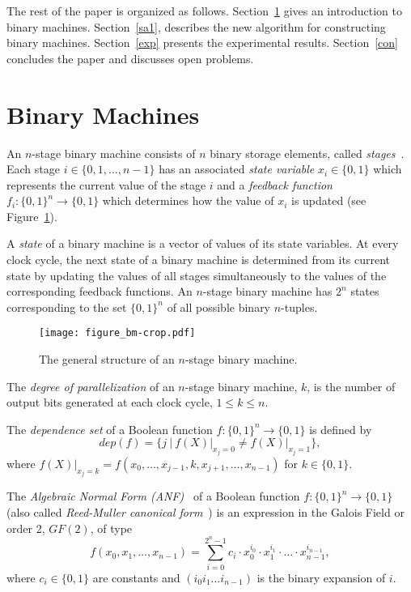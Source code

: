 \documentclass[10pt,conference]{IEEEtran}
\begin{document}
The rest of the paper is organized as follows. 
Section~\ref{bm} gives an introduction to binary machines.
Section~\ref{sa1}, describes the new algorithm for constructing binary
machines.  
Section~\ref{exp} presents the experimental results.
Section~\ref{con} concludes the paper and discusses open problems.

\section{Binary Machines} \label{bm}

An $n$-stage binary machine consists of $n$
binary storage elements, called {\em stages}~\cite{Golomb_book}. 
Each stage $i \in \{0,1, \ldots,n-1\}$ has an associated {\em state variable} $x_i \in \{0,1\}$ 
which represents the current value of the stage $i$ and a {\em feedback function} 
$f_i: \{0,1\}^n \rightarrow \{0,1\}$ which determines how the value of $x_i$ is updated (see Figure~\ref{bin_machine}).

A {\em state} of a binary machine is a vector of values of its
state variables. At every clock cycle, 
the next state of a binary machine is determined from its current state 
by updating the values of all stages simultaneously
to the values of the corresponding feedback functions.
An $n$-stage binary machine has $2^n$ states corresponding to the 
set $\{0,1\}^n$ of all possible binary $n$-tuples.

\begin{figure}[t!]
\begin{center}
    \texttt{[image: figure\_bm-crop.pdf]}
\caption{The general structure of an $n$-stage binary machine.}\label{bin_machine}
\end{center}
\end{figure}

The {\em degree of parallelization} of an $n$-stage binary machine, $k$, is the number of output bits  generated at each clock cycle, $1 \leq k \leq n$.






The {\em dependence set} of a Boolean function $f: \{0,1\}^n \rightarrow \{0,1\}$ is defined by
\[
dep(f) = \{j \ | \ f(X)|_{x_j=0} \not = f(X)|_{x_j=1}\},
\]
where $f(X)|_{x_j=k} = f(x_0, \ldots, x_{j-1}, k, x_{j+1}, \ldots, x_{n-1})$
for $k \in \{0,1\}$.



The {\em Algebraic Normal Form (ANF)}~\cite{CuS09} of a Boolean function $f: \{0,1\}^n \rightarrow \{0,1\}$ 
(also called {\em Reed-Muller canonical form}~\cite{Gr91})
is an expression in the Galois Field or order 2, $GF(2)$, of type
\[
f(x_0, x_1,\ldots,x_{n-1}) = \sum_{i=0}^{2^n-1}  c_i \cdot 
x_0^{i_0} \cdot x_1^{i_1} \cdot \ldots \cdot x_{n-1}^{i_{n-1}},
\]
where $c_i \in \{0,1\}$ are constants
and $(i_0 i_1 \ldots i_{n-1})$ is the binary
expansion of $i$.
\end{document}
